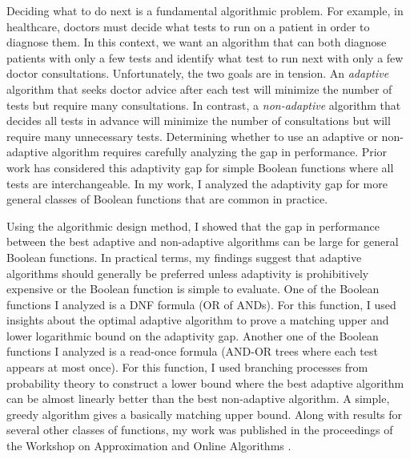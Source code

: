 \documentclass[11pt]{article}
\begin{document}

\noindent Deciding what to do next is a fundamental algorithmic problem.
For example, in healthcare, doctors must decide what tests to run on a patient in order to diagnose them.
In this context, we want an algorithm that can both diagnose patients with only a few tests and identify what test to run next with only a few doctor consultations.
Unfortunately, the two goals are in tension.
An \textit{adaptive} algorithm that seeks doctor advice after each test will minimize the number of tests but require many consultations.
In contrast, a \textit{non-adaptive} algorithm that decides all tests in advance will minimize the number of consultations but will require many unnecessary tests.
Determining whether to use an adaptive or non-adaptive algorithm requires carefully analyzing the gap in performance.
Prior work has considered this adaptivity gap for simple Boolean functions where all tests are interchangeable.
In my work, I analyzed the adaptivity gap for more general classes of Boolean functions that are common in practice.

Using the algorithmic design method,
I showed that the gap in performance between the best adaptive and non-adaptive algorithms can be large for general Boolean functions.
In practical terms, my findings suggest that adaptive algorithms should generally be preferred unless adaptivity is prohibitively expensive or the Boolean function is simple to evaluate.
One of the Boolean functions I analyzed is a DNF formula (OR of ANDs).
For this function, I used insights about the optimal adaptive algorithm to prove a matching upper and lower logarithmic bound on the adaptivity gap.
Another one of the Boolean functions I analyzed is a read-once formula (AND-OR trees where each test appears at most once).
For this function, I used branching processes from probability theory to construct a lower bound where the best adaptive algorithm can be almost linearly better than the best non-adaptive algorithm.
A simple, greedy algorithm gives a basically matching upper bound.
Along with results for several other classes of functions, my work was published in the proceedings of the Workshop on Approximation and Online Algorithms \cite{hellerstein2022adaptivity}.
\end{document}
